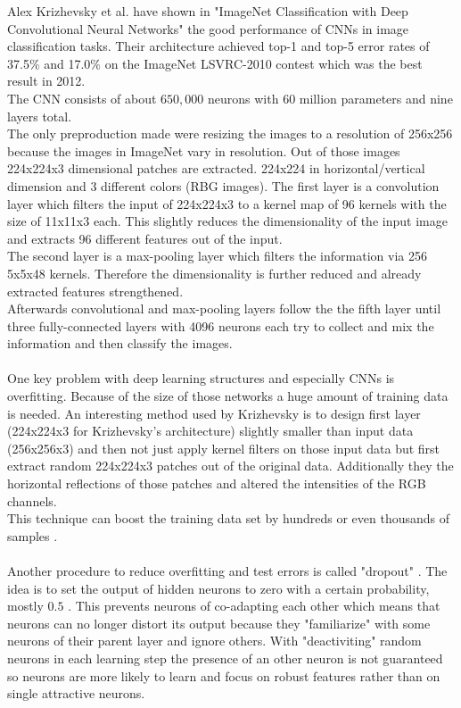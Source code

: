 \documentclass[12pt,twoside]{article}
\theoremstyle{plain}
\theoremstyle{definition}
\theoremstyle{remark}
\begin{document}
Alex Krizhevsky et al. have shown in "ImageNet Classification with Deep Convolutional Neural Networks" \cite{ImangeNetClassificationCNN-Krizhevsky} the good performance of CNNs in image classification tasks. Their architecture achieved top-1 and top-5 error rates of 37.5\% and 17.0\% on the ImageNet LSVRC-2010 contest which was the best result in 2012.
\\
The CNN consists of about $650,000$ neurons with $60$ million parameters and nine layers total.
\\
The only preproduction made were resizing the images to a resolution of 256x256 because the images in ImageNet vary in resolution. Out of those images 224x224x3 dimensional patches are extracted. 224x224 in horizontal/vertical dimension and 3 different colors (RBG images). The first layer is a convolution layer which filters the input of 224x224x3 to a kernel map of 96 kernels with the size of 11x11x3 each. This slightly reduces the dimensionality of the input image and extracts 96 different features out of the input.
\\
The second layer is a max-pooling layer which filters the information via 256 5x5x48 kernels. Therefore the dimensionality is further reduced and already extracted features strengthened.
\\
Afterwards convolutional and max-pooling layers follow the the fifth layer until three fully-connected layers with 4096 neurons each try to collect and mix the information and then classify the images.
\\
\\
One key problem with deep learning structures and especially CNNs is overfitting. Because of the size of those networks a huge amount of training data is needed. An interesting method used by Krizhevsky is to design first layer (224x224x3 for Krizhevsky's architecture) slightly smaller than input data (256x256x3) and then not just apply kernel filters on those input data but first extract random 224x224x3 patches out of the original data. Additionally they the horizontal reflections of those patches and altered the intensities of the RGB channels.
\\
This technique can boost the training data set by hundreds or even thousands of samples \cite{ImangeNetClassificationCNN-Krizhevsky}.
\\
\\
Another procedure to reduce overfitting and test errors is called "dropout" \cite{ImprovingNeuralNetworksDropout-Hinton-Krizhevsky}. The idea is to set the output of hidden neurons to zero with a certain probability, mostly $0.5$ \cite{ImangeNetClassificationCNN-Krizhevsky}. This prevents neurons of co-adapting each other which means that neurons can no longer distort its output because they "familiarize" with some neurons of their parent layer and ignore others. With "deactiviting" random neurons in each learning step the presence of an other neuron is not guaranteed so neurons are more likely to learn and focus on robust features rather than on single attractive neurons.
\end{document}
